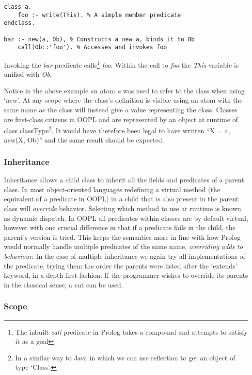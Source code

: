 \documentclass[12pt,a4paper,twoside,openright]{report}
\begin{document}
\begin{lstlisting}
class a.
	foo :- write(This). % A simple member predicate
endclass.

bar :- new(a, Ob), % Constructs a new a, binds it to Ob
	call(Ob::'foo'). % Accesses and invokes foo
\end{lstlisting}

Invoking the \emph{bar} predicate calls\footnote{The inbuilt \emph{call} predicate in Prolog takes a compound and attempts to satisfy it as a goal} \emph{foo}. Within the call to \emph{foo} the \emph{This} variable is unified with \emph{Ob}.

\bigskip

Notice in the above example an atom \emph{a} was used to refer to the class when using `new'. At any scope where the class's definition is visible using an atom with the same name as the class will instead give a value representing the class. Classes are first-class citizens in OOPL and are represented by an object at runtime of class classType\footnote{In a similar way to Java in which we can use reflection to get an object of type `Class'.}. It would have therefore been legal to have written ``X = a, new(X, Ob)'' and the same result should be expected.

\subsubsection {Inheritance}

Inheritance allows a child class to inherit all the fields and predicates of a parent class. In most object-oriented languages redefining a virtual method (the equivalent of a predicate in OOPL) in a child that is also present in the parent class will \emph{override} behavior. Selecting which method to use at runtime is known as dynamic dispatch. In OOPL all predicates within classes are by default virtual, however with one crucial difference in that if a predicate fails in the child, the parent's version is tried. This keeps the semantics more in line with how Prolog would normally handle multiple predicates of the same name, \emph{overriding adds to behaviour}. In the case of multiple inheritance we again try all implementations of the predicate, trying them the order the parents were listed after the `extends' keyword, in a depth first fashion. If the programmer wishes to override its parents in the classical sense, a cut can be used.

\subsubsection {Scope}
\end{document}
